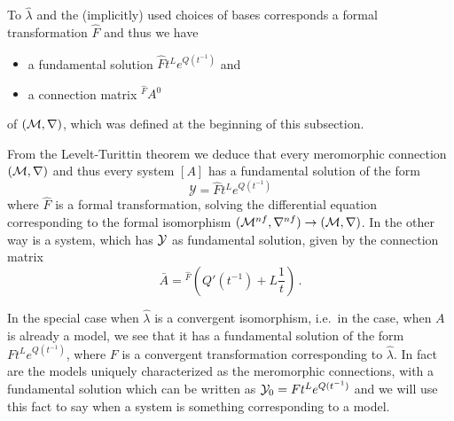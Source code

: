 To $\hat\lambda$ and the (implicitly) used choices of bases corresponds a
formal transformation $\hat F$ and thus we have
\begin{itemize}
  \item a fundamental solution $\hat Ft^L e^{Q(t^{-1})}$ and
  \item a connection matrix ${}^{\hat F}\!A^0$
\end{itemize}
of $(\mathcal{M},\nabla)$, which was defined at the beginning of this subsection.
\begin{cor}
  From the Levelt-Turittin theorem we deduce that every meromorphic connection
  $(\mathcal{M},\nabla)$ and thus every system $[A]$ has a fundamental solution of the
  form
  \[
    \mathcal{Y}=\hat F t^L e^{Q(t^{-1})}
  \]
  where $\hat F$ is a formal transformation, solving the differential equation
  corresponding to the formal isomorphism
  $(\mathcal{M}^{nf},\nabla^{nf})\to(\mathcal{M},\nabla)$.
  In the other way is a system, which has $\mathcal{Y}$ as fundamental solution, given
  by the connection matrix
  \[
    \bar A={}^{\hat F}\!\left(Q'(t^{-1})+L\frac{1}{t}\right) \,.
  \]
  \begin{comment}
    \begin{s-rem}
      It is always possible to permutate the columns of a fundamental solution
      by
      \[
        P^{-1}\mathcal{Y}P=\hat F t^{P^{-1}LP} e^{P^{-1}Q(t^{-1})P}
      \]
      with a permutation matrix $P$ and \rewrite{obtain another fundamental
      solution for the same system} (cf.\ \cite[73]{Loday2014}).
    \end{s-rem}
  \end{comment}
\end{cor}
In the special case when $\hat\lambda$ is a convergent isomorphism, i.e.\ in
the case, when $A$ is already a model, we see that it has a fundamental
solution of the form $Ft^L e^{Q(t^{-1})}$, where $F$ is a convergent
transformation corresponding to $\hat\lambda$.
In fact are the models uniquely characterized as the meromorphic connections,
with a fundamental solution which can be written as $\mathcal{Y}_0=Ft^Le^{Q(t^{-1})}$
and we will use this fact to say when a system is something corresponding to a
model.
